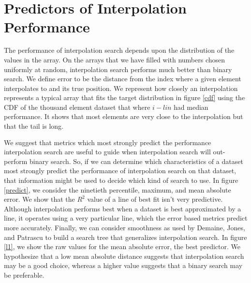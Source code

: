\documentclass[twocolumn]{article}
\begin{document}
\section{Predictors of Interpolation Performance}
\begin{figure}[t]
\end{figure} \label{cdf}

The performance of interpolation search depends upon the distribution of the values in the array. On the arrays that we have filled with numbers chosen uniformly at random, interpolation search performs much better than binary search. We define error to be the distance from the index where a given element interpolates to and its true position. We represent how closely an interpolation represents a typical array that fits the target distribution in figure \ref{cdf} using the CDF of the thousand element dataset that where $i-lin$ had median performance. It shows that most elements are very close to the interpolation but that the tail is long.

We suggest that metrics which most strongly predict the performance interpolation search are useful to guide when interpolation search will out-perform binary search. So, if we can determine which characteristics of a dataset most strongly predict the performance of interpolation search on that dataset, that information might be used to decide which kind of search to use. In figure \ref{predict}, we consider the ninetieth percentile, maximum, and mean absolute error. We show that the $R^2$ value of a line of best fit isn't very predictive. Although interpolation performs best when a dataset is best approximated by a line, it operates using a very particular line, which the error based metrics predict more accurately. Finally, we can consider smoothness as used by Demaine, Jones, and Patrascu to build a search tree that generalizes interpolation search. \cite{demaine-jones-patrascu} In figure \ref{l1}, we show the raw values for the mean absolute error, the best predictor. We hypothesize that a low mean absolute distance suggests that interpolation search may be a good choice, whereas a higher value suggests that a binary search may be preferable.
\end{document}
